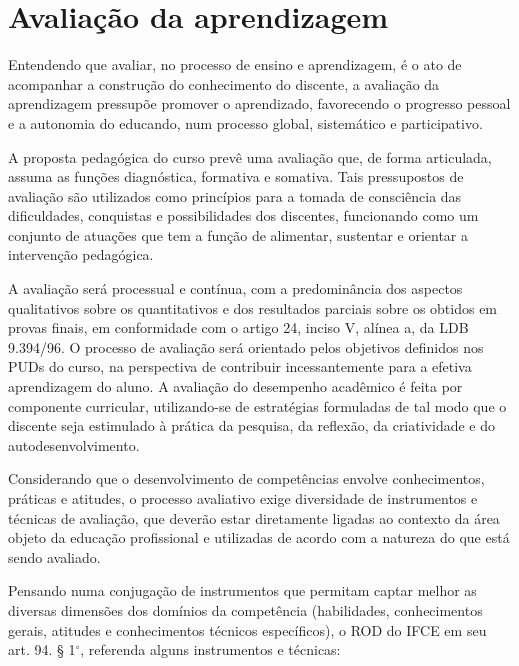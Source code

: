 \documentclass[
	12pt,				%
	openright,			%
	twoside,			%
	a4paper,			%
	chapter=TITLE,		%
	english,			%
	french,				%
	spanish,			%
	brazil,				%
	]{abntex2}
\begin{document}
\chapter{Avaliação da aprendizagem}

Entendendo que avaliar, no processo de ensino e aprendizagem, é o ato de acompanhar a construção do conhecimento do discente, a avaliação da aprendizagem pressupõe promover o aprendizado, favorecendo o progresso pessoal e a autonomia do educando, num processo global, sistemático e participativo.

A proposta pedagógica do curso prevê uma avaliação que, de forma articulada, assuma as funções diagnóstica, formativa e somativa. Tais pressupostos de avaliação são utilizados como princípios para a tomada de consciência das dificuldades, conquistas e possibilidades dos discentes, funcionando como um conjunto de atuações que tem a função de alimentar, sustentar e orientar a intervenção pedagógica.

A avaliação será processual e contínua, com a predominância dos aspectos qualitativos sobre os quantitativos e dos resultados parciais sobre os obtidos em provas finais, em conformidade com o artigo 24, inciso V, alínea a, da LDB 9.394/96. O processo de avaliação será orientado pelos objetivos definidos nos PUDs do curso, na perspectiva de contribuir incessantemente para a efetiva aprendizagem do aluno. A avaliação do desempenho acadêmico é feita por componente curricular, utilizando-se de estratégias formuladas de tal modo que o discente seja estimulado à prática da pesquisa, da reflexão, da criatividade e do autodesenvolvimento.


Considerando que o desenvolvimento de competências envolve conhecimentos, práticas e atitudes, o processo avaliativo exige diversidade de instrumentos e técnicas de avaliação, que deverão estar diretamente ligadas ao contexto da área objeto da educação profissional e utilizadas de acordo com a natureza do que está sendo avaliado.

Pensando numa conjugação de instrumentos que permitam captar melhor as diversas dimensões dos domínios da competência (habilidades, conhecimentos gerais, atitudes e conhecimentos técnicos específicos), o ROD do IFCE em seu art. 94. § 1$^\circ$, referenda alguns instrumentos e técnicas:
\end{document}
